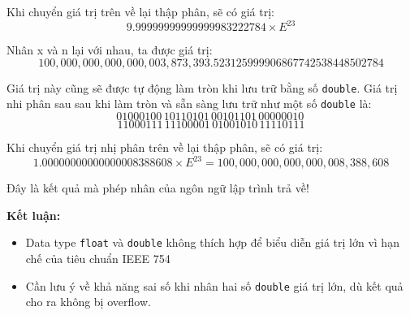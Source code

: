 Khi chuyển giá trị trên về lại thập phân, sẽ có giá trị:
\[
9.99999999999999983222784 \times E^{23}
\]

Nhân x và n lại với nhau, ta được giá trị:
\[
100,000,000,000,000,003,873,393.523125999906867742538448502784
\]

Giá trị này cũng sẽ được tự động làm tròn khi lưu trữ bằng số \texttt{double}. Giá trị nhi phân sau sau khi làm tròn và sẵn sàng lưu trữ như một số \texttt{double} là:
\[01000100\, 10110101\, 00101101\, 00000010\,\]
\[11000111\, 11100001\, 01001010\, 11110111\]

Khi chuyển giá trị nhị phân trên về lại thập phân, sẽ có giá trị:
\[
 1.00000000000000008388608 \times E^{23} = 100,000,000,000,000,008,388,608
\]

Đây là kết quả mà phép nhân của ngôn ngữ lập trình trả về! 

\textbf{Kết luận:}

\begin{itemize}
    \item Data type \texttt{float} và \texttt{double} không thích hợp để biểu diễn giá trị lớn vì hạn chế của tiêu chuẩn IEEE 754
    \item Cần lưu ý về khả năng sai số khi nhân hai số \texttt{double} giá trị lớn, dù kết quả cho ra không bị overflow.
\end{itemize}
